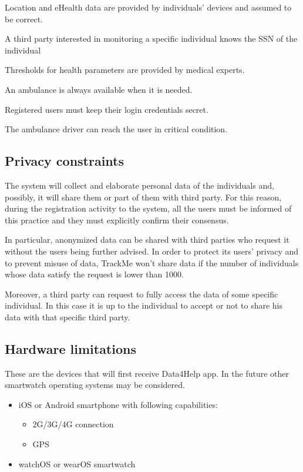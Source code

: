 \begin{dom}
Location and eHealth data are provided by individuals' devices and assumed to be correct.
\end{dom}
\begin{dom}
A third party interested in monitoring a specific individual knows the SSN of the individual
\end{dom}
\begin{dom}
Thresholds for health parameters are provided by medical experts.
\end{dom}
\begin{dom}
An ambulance is always available when it is needed.
\end{dom}
\begin{dom}
Registered users must keep their login credentials secret.
\end{dom}
\begin{dom}
The ambulance driver can reach the user in critical condition.
\end{dom}



\subsection{Privacy constraints}
The system will collect and elaborate personal data of the individuals and, possibly, it will share them or part of them with third party.  For this reason, during the registration activity to the system, all the users must be informed of this practice and they must explicitly confirm their consensus.

In particular, anonymized data can be shared with third parties who request it without the users being further advised. In order to protect its users' privacy and to prevent misuse of data, TrackMe won't share data if the number of individuals whose data satisfy the request is lower than 1000.

Moreover, a third party can request to fully access the data of some specific individual. In this case it is up to the individual to accept or not to share his data with that specific third party.

\subsection{Hardware limitations}
These are the devices that will first receive Data4Help app. 
In the future other smartwatch operating systems may be considered.
\begin{itemize}
\item iOS or Android smartphone with following capabilities:
\begin{itemize}
\item 2G/3G/4G connection
\item GPS
\end{itemize}
\item watchOS or wearOS smartwatch
\end{itemize}

